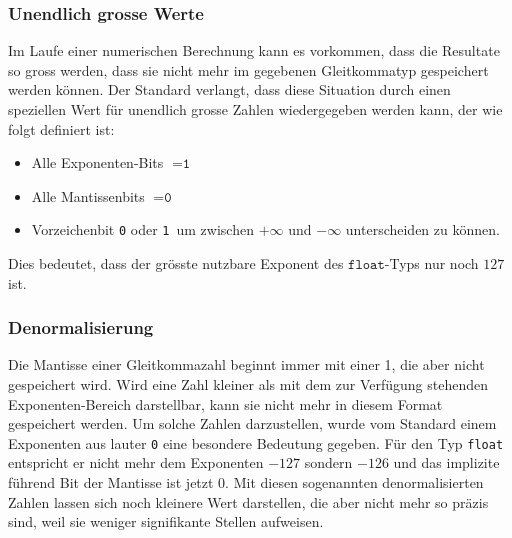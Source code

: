 \subsubsection{Unendlich grosse Werte}
Im Laufe einer numerischen Berechnung kann es vorkommen, dass die Resultate
so gross werden, dass sie nicht mehr im gegebenen Gleitkommatyp gespeichert
werden können.
Der Standard verlangt, dass diese Situation durch einen speziellen Wert
für unendlich grosse Zahlen wiedergegeben werden kann, der wie
folgt definiert ist:
\begin{itemize}
\item Alle Exponenten-Bits $= \texttt{1}$
\item Alle Mantissenbits $=\texttt{0}$
\item Vorzeichenbit \texttt{0} oder \texttt{1} um zwischen
$+\infty$ und $-\infty$ unterscheiden zu können.
\end{itemize}
Dies bedeutet, dass der grösste nutzbare Exponent des $\texttt{float}$-Typs
nur noch $127$ ist.

\subsubsection{Denormalisierung
\label{buch:zahlensysteme:denormalisierung}}
%
Die Mantisse einer Gleitkommazahl beginnt immer mit einer 1, die aber
nicht gespeichert wird.
Wird eine Zahl kleiner als mit dem zur Verfügung stehenden Exponenten-Bereich
darstellbar, kann sie nicht mehr in diesem Format gespeichert werden.
Um solche Zahlen darzustellen, wurde vom Standard einem Exponenten aus
lauter \texttt{0} eine besondere Bedeutung gegeben.
Für den Typ \texttt{float} entspricht er nicht mehr dem Exponenten $-127$
sondern $-126$ und das implizite führend Bit der Mantisse ist jetzt 0.
Mit diesen sogenannten denormalisierten Zahlen lassen sich noch kleinere
Wert darstellen, die aber nicht mehr so präzis sind, weil sie weniger
signifikante Stellen aufweisen.


